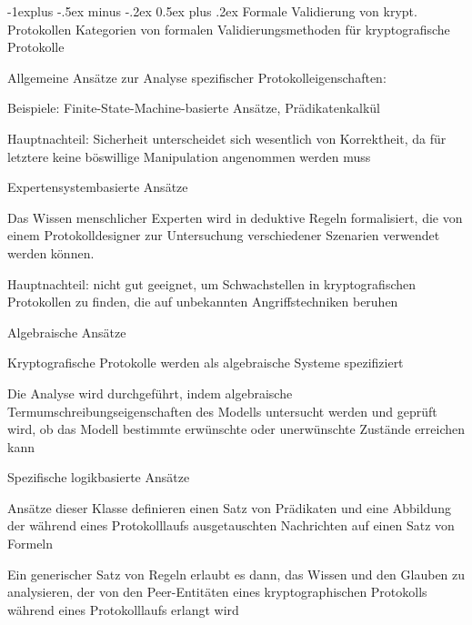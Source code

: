\documentclass[a4paper]{article}
\makeatletter
\renewcommand{\subsection}{\@startsection{subsection}{2}{0mm}%
 {-1explus -.5ex minus -.2ex}%
 {0.5ex plus .2ex}%
 {\normalfont\normalsize\bfseries}}
\makeatother
\begin{document}
\begin{multicols}{3}
      \subsection{Formale Validierung von krypt. Protokollen}
      Kategorien von formalen Validierungsmethoden für kryptografische Protokolle
      \begin{itemize*}
            \item Allgemeine Ansätze zur Analyse spezifischer Protokolleigenschaften:
            \begin{itemize*}
                  \item Beispiele: Finite-State-Machine-basierte Ansätze, Prädikatenkalkül %
                  \item Hauptnachteil: Sicherheit unterscheidet sich wesentlich von Korrektheit, da für letztere keine böswillige Manipulation angenommen werden muss
            \end{itemize*}
            \item Expertensystembasierte Ansätze
            \begin{itemize*}
                  \item Das Wissen menschlicher Experten wird in deduktive Regeln formalisiert, die von einem Protokolldesigner zur Untersuchung verschiedener Szenarien verwendet werden können.
                  \item Hauptnachteil: nicht gut geeignet, um Schwachstellen in kryptografischen Protokollen zu finden, die auf unbekannten Angriffstechniken beruhen
            \end{itemize*}
            \item Algebraische Ansätze
            \begin{itemize*}
                  \item Kryptografische Protokolle werden als algebraische Systeme spezifiziert
                  \item Die Analyse wird durchgeführt, indem algebraische Termumschreibungseigenschaften des Modells untersucht werden und geprüft wird, ob das Modell bestimmte erwünschte oder unerwünschte Zustände erreichen kann
            \end{itemize*}
            \item Spezifische logikbasierte Ansätze
            \begin{itemize*}
                  \item Ansätze dieser Klasse definieren einen Satz von Prädikaten und eine Abbildung der während eines Protokolllaufs ausgetauschten Nachrichten auf einen Satz von Formeln
                  \item Ein generischer Satz von Regeln erlaubt es dann, das Wissen und den Glauben zu analysieren, der von den Peer-Entitäten eines kryptographischen Protokolls während eines Protokolllaufs erlangt wird %
            \end{itemize*}
      \end{itemize*}
      \columnbreak


\end{multicols}
\end{document}

